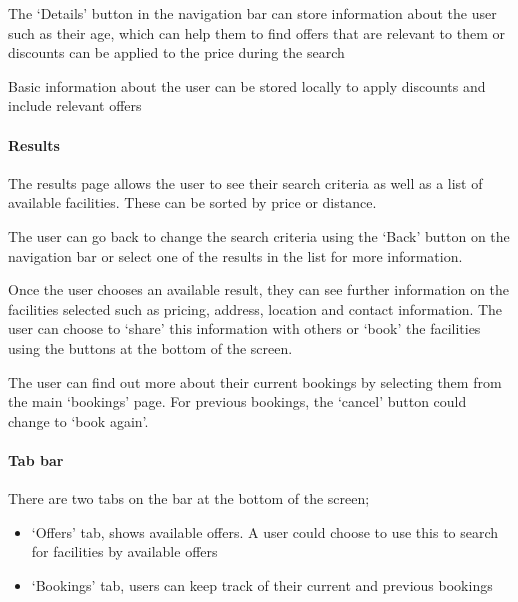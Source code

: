 The `Details' button in the navigation bar can store information about the user
such as their age, which can help them to find offers that are relevant to them
or discounts can be applied to the price during the search

Basic information about the user can be stored locally to apply discounts and
include relevant offers

\paragraph{Results}

The results page allows the user to see their search criteria as well as a list
of available facilities. These can be sorted by price or distance.

The user can go back to change the search criteria using the `Back' button on
the navigation bar or select one of the results in the list for more
information.

Once the user chooses an available result, they can see further information on
the facilities selected such as pricing, address, location and contact
information. The user can choose to `share' this information with others or
`book' the facilities using the buttons at the bottom of the screen.

The user can find out more about their current bookings by selecting them from
the main `bookings' page. For previous bookings, the `cancel' button could
change to `book again'.

\paragraph{Tab bar}

There are two tabs on the bar at the bottom of the screen;
\begin{itemize}
	\item `Offers' tab, shows available offers. A user could choose to use
		this to search for facilities by available offers
	\item `Bookings' tab, users can keep track of their current and previous
		bookings
\end{itemize}

